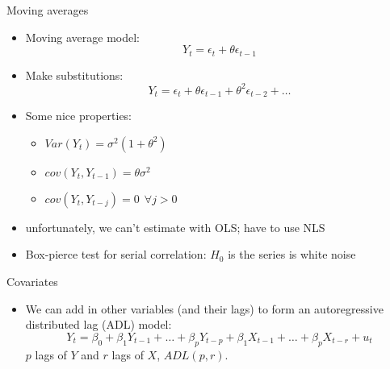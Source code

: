 \documentclass[aspectratio=169]{beamer}
\begin{document}
\begin{frame}{Moving averages}
    \begin{itemize}
        \item Moving average model:
        $$
         Y_t = \epsilon_t + \theta \epsilon_{t-1}
        $$
       \item Make substitutions:
       $$
        Y_t = \epsilon_t + \theta \epsilon_{t-1} + \theta^2 \epsilon_{t-2} + \dots
       $$
       \item Some nice properties:
       \begin{itemize}
        \item $Var(Y_t) = \sigma^2 ( 1 +\theta^2)$
        \item $cov(Y_t, Y_{t-1}) = \theta \sigma^2$
        \item $cov(Y_t, Y_{t-j}) = 0 ~~ \forall j>0$
    \end{itemize}
        \item unfortunately, we can't estimate with OLS; have to use NLS
        \item Box-pierce test for serial correlation: $H_0$ is the series is white noise
    \end{itemize}
\end{frame}


\begin{frame}{Covariates}
    \begin{itemize}
       \item We can add in other variables (and their lags) to form an autoregressive distributed lag (ADL) model:
       $$
       Y_t = \beta_0 + \beta_1 Y_{t-1} + \dots + \beta_p Y_{t-p} + \beta_1 X_{t-1} + \dots + \beta_p X_{t-r} + u_t
      $$
      $p$ lags of $Y$ and $r$ lags of $X$, $ADL(p,r)$.
    \end{itemize}
\end{frame}
\end{document}
